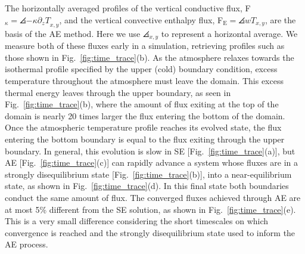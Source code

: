 The horizontally averaged profiles of the vertical conductive flux, 
F$_{\kappa} = \angles{-\kappa\partial_z T}_{x,y}$, and the vertical convective enthalpy flux,
F$_{\text{E}} = \angles{wT}_{x,y}$, are the basis of the AE method.
Here we use $\angles{}_{x,y}$ to represent a horizontal average. We measure
both of these fluxes early in a simulation, retrieving profiles such as
those shown in Fig.~\ref{fig:time_trace}(b).
As the atmosphere relaxes towards
the isothermal profile specified by the upper (cold) boundary condition, excess
temperature throughout the atmosphere must leave the domain. This excess thermal
energy leaves through the upper boundary, as seen in 
Fig.~\ref{fig:time_trace}(b), where the amount of flux exiting at the top of the domain
is nearly 20 times larger the flux entering the bottom of the domain. Once the atmospheric
temperature profile reaches its evolved state, the flux entering the bottom boundary
is equal to the flux exiting through the upper boundary.  In general, this 
evolution is slow in SE [Fig.~\ref{fig:time_trace}(a)], but AE [Fig.~\ref{fig:time_trace}(c)]
can rapidly advance a system whose fluxes are in a strongly disequilibrium state [Fig.~\ref{fig:time_trace}(b)],
into a near-equilibrium state, as shown in Fig.~\ref{fig:time_trace}(d). In
this final state both boundaries conduct the same amount of flux.
The converged fluxes achieved through AE are at most 5\% different from the SE solution, 
as shown in Fig.~\ref{fig:time_trace}(e). 
This is a very small difference considering the short timescales on which convergence
is reached and the strongly disequilibrium state used to inform the AE process.

